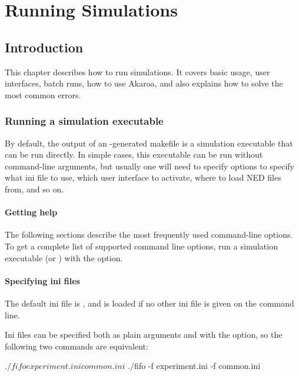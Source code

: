 \chapter{Running Simulations}
\label{cha:run-sim}

\section{Introduction}

This chapter describes how to run simulations. It covers basic usage,
user interfaces, batch runs, how to use Akaroa, and also explains
how to solve the most common errors.

\subsection{Running a simulation executable}
\label{sec:ch-run-sim:running}

By default, the output of an -generated makefile is
a simulation executable that can be run directly. In simple cases,
this executable can be run without command-line arguments, but usually
one will need to specify options to specify what ini file to use,
which user interface to activate, where to load NED files from, and so on.

\subsubsection{Getting help}

The following sections describe the most frequently used command-line
options. To get a complete list of supported command line options, run
a simulation executable (or ) with the  option.


\subsubsection{Specifying ini files}

The default ini file is , and is
loaded if no other ini file is given on the command line.

Ini files can be specified both as plain arguments and with the 
option, so the following two commands are equivalent:

\begin{commandline}
$ ./fifo experiment.ini common.ini
$ ./fifo -f experiment.ini -f common.ini
\end{commandline}

